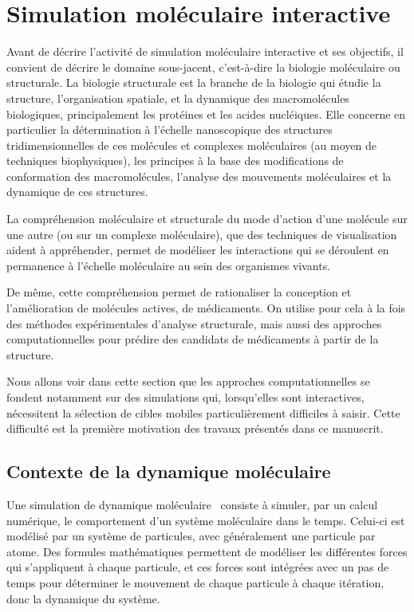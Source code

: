 	\section{Simulation moléculaire interactive}
	Avant de décrire l'activité de simulation moléculaire interactive et ses objectifs, il convient de décrire le domaine sous-jacent, c'est-à-dire la biologie moléculaire ou structurale. 
	La biologie structurale est la branche de la biologie qui étudie la structure, l'organisation spatiale, et la dynamique des macromolécules biologiques, principalement les protéines et les acides nucléiques. Elle concerne en particulier la détermination à l'échelle nanoscopique des structures tridimensionnelles de ces molécules et complexes moléculaires (au moyen de techniques biophysiques), les principes à la base des modifications de conformation des macromolécules, l'analyse des mouvements moléculaires et la dynamique de ces structures.

	La compréhension moléculaire et structurale du mode d'action d'une molécule sur une autre (ou sur un complexe moléculaire), que des techniques de visualisation aident à appréhender, permet de modéliser les interactions qui se déroulent en permanence à l'échelle moléculaire au sein des organismes vivants.

	De même, cette compréhension permet de rationaliser la conception et l'amélioration de molécules actives, de médicaments. On utilise pour cela à la fois des méthodes expérimentales d'analyse structurale, mais aussi des approches computationnelles pour prédire des candidats de médicaments à partir de la structure.

	Nous allons voir dans cette section que les approches computationnelles se fondent notamment sur des simulations qui, lorsqu'elles sont interactives, nécessitent la sélection de cibles mobiles particulièrement difficiles à saisir. Cette difficulté est la première motivation des travaux présentés dans ce manuscrit.
	
	\FloatBarrier \subsection{Contexte de la dynamique moléculaire}
	Une simulation de dynamique moléculaire~\cite{fermi1955alamos, alder1959studies, rahman1964correlations, gibson1960dynamics, lennard1924determination} consiste à simuler, par un calcul numérique, le comportement d'un système moléculaire dans le temps. Celui-ci est modélisé par un système de particules, avec généralement une particule par atome. Des formules mathématiques permettent de modéliser les différentes forces qui s'appliquent à chaque particule, et ces forces sont intégrées avec un pas de temps pour déterminer le mouvement de chaque particule à chaque itération, donc la dynamique du système.
	
